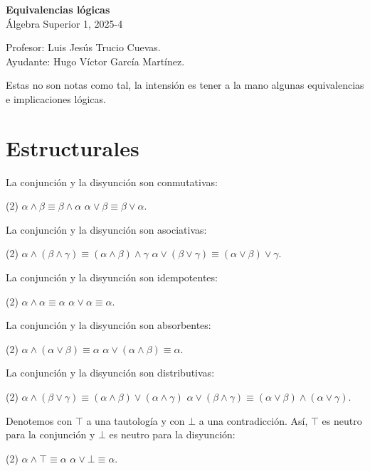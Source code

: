 \documentclass[letterpaper,DIV=12,headsepline,12pt]{scrartcl}
\begin{document}
\thispagestyle{beginstyle}
\begin{center}
  {\fontsize{30}{60}\rmfamily \textbf{Equivalencias lógicas}}
  \\ \vspace{.2cm}
  Álgebra Superior 1, 2025-4
\end{center}
\begin{flushright}
  \footnotesize \hfill Profesor: Luis Jesús Trucio Cuevas.\\
  \hfill Ayudante: Hugo Víctor García Martínez.
\end{flushright}

\noindent
Estas no son notas como tal, la intensión es tener a la mano algunas
equivalencias e implicaciones lógicas.

\section{Estructurales}
La conjunción y la disyunción son conmutativas:
\begin{tasks}(2)
  \task \(\alpha\land\beta\equiv\beta\land\alpha\)
  \task \(\alpha\lor\beta\equiv\beta\lor\alpha\).
\end{tasks}
%
La conjunción y la disyunción son asociativas:
\begin{tasks}(2)
  \task \(\alpha\land(\beta\land\gamma)\equiv(\alpha\land\beta)\land\gamma\)
  \task \(\alpha\lor(\beta\lor\gamma)\equiv(\alpha\lor\beta)\lor\gamma\).
\end{tasks}
%
La conjunción y la disyunción son idempotentes:
\begin{tasks}(2)
  \task \(\alpha\land\alpha\equiv\alpha\)
  \task \(\alpha\lor\alpha\equiv\alpha\).
\end{tasks}
%
La conjunción y la disyunción son absorbentes:
\begin{tasks}(2)
  \task \(\alpha\land(\alpha\lor\beta)\equiv\alpha\)
  \task \(\alpha\lor(\alpha\land\beta)\equiv\alpha\).
\end{tasks}
%
La conjunción y la disyunción son distributivas:
\begin{tasks}(2)
  \task \(\alpha\land(\beta\lor\gamma)\equiv(\alpha\land\beta)\lor(\alpha\land\gamma)\)
  \task \(\alpha\lor(\beta\land\gamma)\equiv(\alpha\lor\beta)\land(\alpha\lor\gamma)\).
\end{tasks}
%
Denotemos con \(\top\) a una tautología y con \(\bot\) a una contradicción. Así,
\(\top\) es neutro para la conjunción y \(\bot\) es neutro para la disyunción:
\begin{tasks}(2)
  \task \(\alpha\land\top\equiv\alpha\)
  \task \(\alpha\lor\bot\equiv\alpha\).
\end{tasks}
\end{document}
